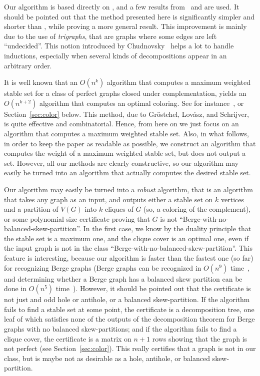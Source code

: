 \documentclass[11 pt] {article}
\begin{document}
Our algorithm is based directly on \cite{thesis,trigraphs}, and a few
results from~\cite{nicolas:bsp} and \cite{nicolas.kristina:2-join} are
used.  It should be pointed out that the method presented here is
significantly simpler and shorter than \cite{nicolas.kristina:2-join},
while proving a more general result.  This improvement is mainly due
to the use of \emph{trigraphs}, that are graphs where some edges are
left ``undecided''.  This notion introduced by
Chudnovsky~\cite{thesis,trigraphs} helps a lot to handle inductions,
especially when several kinds of decompositions appear in an arbitrary
order.

It is well known that an $O(n^k)$ algorithm that computes a maximum
weighted stable set for a class of perfect graphs closed under
complementation, yields an $O(n^{k+2})$ algorithm that computes an
optimal coloring.  See for instance~\cite{KrSe:colorP},
\cite{schrijver:opticomb} or Section~\ref{sec:color} below.  This
method, due to Gr\"ostchel, Lov\'asz, and Schrijver, is quite
effective and combinatorial.  Hence, from here on we just focus on an
algorithm that computes a maximum weighted stable set.  Also, in what
follows, in order to keep the paper as readable as possible, we
construct an algorithm that computes the weight of a maximum weighted
stable set, but does not output a set.  However, all our methods are
clearly constructive, so our algorithm may easily be turned into an
algorithm that actually computes the desired stable set.


Our algorithm may easily be turned into a \emph{robust} algorithm,
that is an algorithm that takes any graph as an input, and outputs
either a stable set on $k$ vertices and a partition of $V(G)$ into $k$
cliques of $G$ (so, a coloring of the complement), or some polynomial
size certificate proving that $G$ is not
``Berge-with-no-balanced-skew-partition''.  In the first case, we know
by the duality principle that the stable set is a maximum one, and the
clique cover is an optimal one, even if the input graph is not in the
class ``Berge-with-no-balanced-skew-partition''.  This feature is
interesting, because our algorithm is faster than the fastest one (so
far) for recognizing Berge graphs (Berge graphs can be recognized in
${O}(n^9)$ time~\cite{chudnovsky.c.l.s.v:reco}, and determining
whether a Berge graph has a balanced skew partition can be done in
${O}(n^5)$ time~\cite{nicolas:bsp,ChHaTrVu:2-join}).  However, it should be
pointed out that the certificate is not just and odd hole or antihole,
or a balanced skew-partition.  If the algorithm fails to find a stable
set at some point, the certificate is a decomposition tree, one leaf
of which satisfies none of the outputs of the decomposition theorem
for Berge graphs with no balanced skew-partitions; and if the
algorithm fails to find a clique cover, the certificate is a matrix on
$n+1$ rows showing that the graph is not perfect (see
Section~\ref{sec:color}).  This really certifies that a graph is not
in our class, but is maybe not as desirable as a hole, antihole, or
balanced skew-partition.
\end{document}
